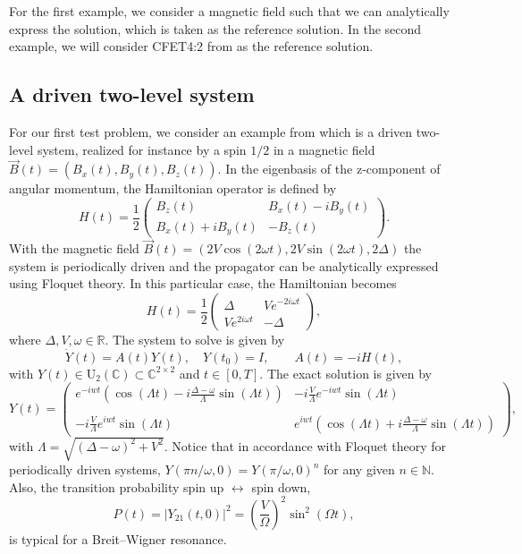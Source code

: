 \documentclass{article}
\newcommand{\R}{\mathbb{R}}
\newcommand{\C}{\mathbb{C}}
\newcommand{\Om}{\Omega}
\begin{document}
{For the first example, we consider a magnetic field such that we can analytically express the solution, which is taken as the reference solution. In the second example, we will consider CFET4:2 from \cite{AF:2011} as the reference solution. 


\subsection{A driven two-level system}

For our first test problem, we consider an example from \cite{AF:2011} which is a driven two-level system, realized for instance by a spin $1/2$ in a magnetic field $\vec B(t) = (B_x(t), B_y(t), B_z(t))$. In the eigenbasis of the z-component of angular momentum, the Hamiltonian operator is defined by
%
\[
H(t) = \frac{1}{2} \begin{pmatrix}
B_z(t) & B_x(t) - i B_y(t) \\
B_x(t) + i B_y(t) & -B_z(t)
\end{pmatrix}.
\]
%
With the magnetic field $\vec B(t) = (2V \cos(2\omega t), 2V \sin(2\omega t), 2 \Delta)$ the system is periodically driven and the propagator can be analytically expressed using Floquet theory. In this particular case, the Hamiltonian becomes
%
\[
H(t) = \frac{1}{2} \begin{pmatrix}
\Delta & V e^{-2i\omega t} \\
V e^{2i\omega t} & -\Delta
\end{pmatrix},
\]
%
where $\Delta, V, \omega \in \R$. The system to solve is given by
%
\begin{equation}
\label{eq:syst-1}
\dot{Y}(t) = A(t)Y(t), \quad Y(t_0) = I, \quad  \quad A(t) = -i H(t),
\end{equation}
%
with $Y(t) \in \mathrm{U}_2(\C) \subset \C^{2\times 2}$ and $t \in [0, T]$. The exact solution is given by
%
\[
Y(t) = \begin{pmatrix}
e^{-i w t}\left(\cos(\Lambda t) - i\frac{\Delta-\omega}{\Lambda}\sin(\Lambda t) \right) & -i\frac{V}{\Lambda}e^{-i w t}\sin(\Lambda t)  \\
& \\
-i\frac{V}{\Lambda}e^{i w t}\sin(\Lambda t) & e^{i w t}\left(\cos(\Lambda t) + i\frac{\Delta-\omega}{\Lambda}\sin(\Lambda t) \right)
\end{pmatrix},
\]
%
with $\Lambda = \sqrt{(\Delta - \omega)^2 + V^2}$. 
Notice that in accordance with Floquet theory for periodically driven systems, $Y(\pi n/\omega, 0) = Y(\pi/\omega, 0)^n$ for any given $n \in \mathbb{N}$. Also, the transition probability spin up $\leftrightarrow$ spin down,
%
\[
P(t) = |Y_{21}(t,0)|^2 = \left(\frac{V}{\Om}\right)^2 \sin^2(\Om t),
\]
%
is typical for a Breit--Wigner resonance.

}
\end{document}
